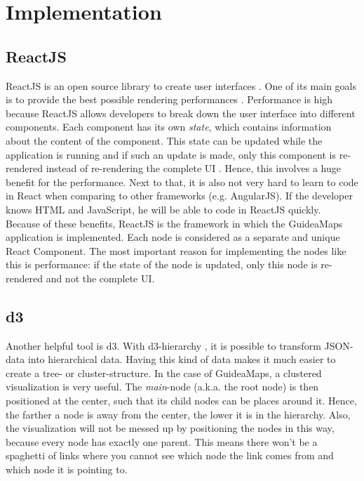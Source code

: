 \chapter{Implementation}\label{ch:implementation}

\section{ReactJS}\label{sec:reactjs}
ReactJS is an open source library to create user interfaces \cite{reactjs.org}. One of its main goals is to provide the best possible rendering performances \cite{thinkwik_why_2017}. Performance is high because ReactJS allows developers to break down the user interface into different components. Each component has its own \textit{state}, which contains information about the content of the component. This state can be updated while the application is running and if such an update is made, only this component is re-rendered instead of re-rendering the complete UI \cite{githubwhyreact}. Hence, this involves a huge benefit for the performance. Next to that, it is also not very hard to learn to code in React when comparing to other frameworks (e.g. AngularJS). If the developer knows HTML and JavaScript, he will be able to code in ReactJS quickly.\\

Because of these benefits, ReactJS is the framework in which the GuideaMaps application is implemented. Each node is considered as a separate and unique React Component. The most important reason for implementing the nodes like this is performance: if the state of the node is updated, only this node is re-rendered and not the complete UI.

\section{d3}\label{sec:d3}
Another helpful tool is d3. With d3-hierarchy \cite{d3hierarchy}, it is possible to transform JSON-data into hierarchical data. Having this kind of data makes it much easier to create a tree- or cluster-structure. In the case of GuideaMaps, a clustered visualization is very useful. The \textit{main}-node (a.k.a. the root node) is then positioned at the center, such that its child nodes can be places around it. Hence, the farther a node is away from the center, the lower it is in the hierarchy. Also, the visualization will not be messed up by positioning the nodes in this way, because every node has exactly one parent. This means there won't be a spaghetti of links where you cannot see which node the link comes from and which node it is pointing to.

